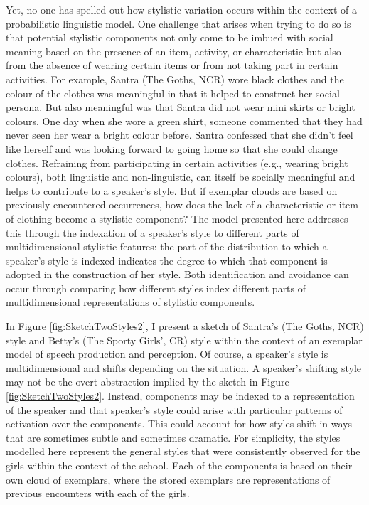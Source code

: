 \noindent Yet, no one has spelled out how stylistic variation occurs within the context of a probabilistic linguistic model.  One challenge that arises when trying to do so is that potential stylistic components not only come to be imbued with social meaning based on the presence of an item, activity, or characteristic but also from the absence of wearing certain items or from not taking part in certain activities.  For example, Santra (The Goths, NCR) wore black clothes and the colour of the clothes was meaningful in that it helped to construct her social persona.  But also meaningful was that Santra did not wear mini skirts or bright colours.  One day when she wore a green shirt, someone commented that they had never seen her wear a bright colour before.  Santra confessed that she didn't feel like herself and was looking forward to going home so that she could change clothes.  Refraining from participating in certain activities (e.g., wearing bright colours), both linguistic and non-linguistic, can itself be socially meaningful and helps to contribute to a speaker's style.  But if exemplar clouds are based on previously encountered occurrences, how does the lack of a characteristic or item of clothing become a stylistic component?  The model presented here addresses this through the indexation of a speaker's style to different parts of multidimensional stylistic features: the part of the distribution to which a speaker's style is indexed indicates the degree to which that component is adopted in the construction of her style.  Both identification and avoidance can occur through comparing how different styles index different parts of multidimensional representations of stylistic components.

In Figure \ref{fig:SketchTwoStyles2}, I present a sketch of Santra's (The Goths, NCR) style and Betty's (The Sporty Girls', CR) style within the context of an exemplar model of speech production and perception.  Of course, a speaker's style is multidimensional and shifts depending on the situation.  A speaker's shifting style may not be the overt abstraction implied by the sketch in Figure \ref{fig:SketchTwoStyles2}.  Instead, components may be indexed to a representation of the speaker and that speaker's style could arise with particular patterns of activation over the components.  This could account for how styles shift in ways that are sometimes subtle and sometimes dramatic.  For simplicity, the styles modelled here represent the general styles that were consistently observed for the girls within the context of the school.  Each of the components is based on their own cloud of exemplars, where the stored exemplars are representations of previous encounters with each of the girls.  

